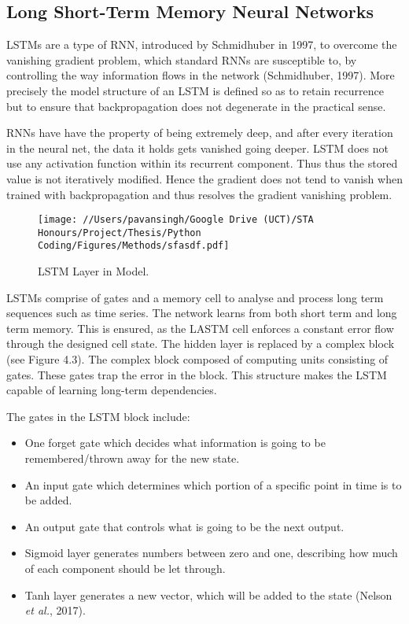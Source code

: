 \newpage
\subsection{Long Short-Term Memory Neural Networks}

LSTMs are a type of RNN, introduced by Schmidhuber in 1997, to overcome the vanishing gradient problem, which standard RNNs are susceptible to, by controlling the way information flows in the network (Schmidhuber, 1997). More precisely the model structure of an LSTM is defined so as to retain recurrence but to ensure that backpropagation does not degenerate in the practical sense. 

RNNs have have the property of being extremely deep, and after every iteration in the neural net, the data it holds gets vanished going deeper. LSTM does not use any activation function within its recurrent component. Thus thus the stored value is not iteratively modified. Hence the gradient does not tend to vanish when trained with backpropagation and thus resolves the gradient vanishing problem. 

\begin{figure}[h]
\centering
  \texttt{[image: //Users/pavansingh/Google Drive (UCT)/STA Honours/Project/Thesis/Python Coding/Figures/Methods/sfasdf.pdf]}
  \caption{LSTM Layer in Model.}
  \label{}
\end{figure}


LSTMs comprise of gates and a memory cell to analyse and process long term sequences such as time series. The network learns from both short term and long term memory. This is ensured, as the LASTM cell enforces a constant error flow through the designed cell state. The hidden layer is replaced by a complex block (see Figure 4.3). The complex block composed of computing units consisting of gates. These gates trap the error in the block. This structure makes the LSTM capable of learning long-term dependencies. 


The gates in the LSTM block include: 
\begin{itemize}
\item One forget gate which decides what information is going to be remembered/thrown away for the new state.
\item An input gate which determines which portion of a specific point in time is to be added.
\item An output gate that controls what is going to be the next output.
\item Sigmoid layer generates numbers between zero and one, describing how much of each component should be let through.
\item Tanh layer generates a new vector, which will be added to the state (Nelson \textit{et al.}, 2017).
\end{itemize}

